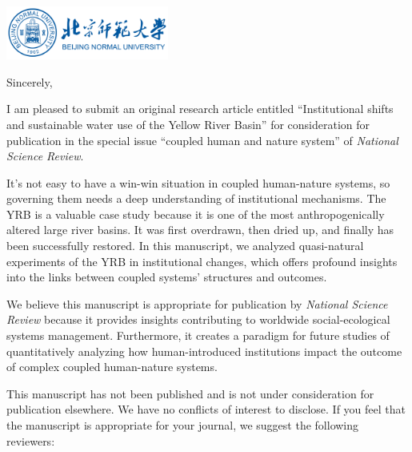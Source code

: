 \documentclass[11pt,a4paper,roman]{moderncv}
\begin{document}
\begin{minipage}[t]{\textwidth}
\includegraphics[width=0.40\textwidth]{bnu}
\end{minipage}


\opening{\vspace*{-2em}}
\closing{Sincerely,}{\vspace*{-2em}}
\makelettertitle

I am pleased to submit an original research article entitled ``Institutional shifts and sustainable water use of the Yellow River Basin'' for consideration for publication in the special issue ``coupled human and nature system'' of \textit{National Science Review}.

It's not easy to have a win-win situation in coupled human-nature systems, so governing them needs a deep understanding of institutional mechanisms. The YRB is a valuable case study because it is one of the most anthropogenically altered large river basins. It was first overdrawn, then dried up, and finally has been successfully restored. In this manuscript, we analyzed quasi-natural experiments of the YRB in institutional changes, which offers profound insights into the links between coupled systems' structures and outcomes.

We believe this manuscript is appropriate for publication by \textit{National Science Review} because it provides insights contributing to worldwide social-ecological systems management. Furthermore, it creates a paradigm for future studies of quantitatively analyzing how human-introduced institutions impact the outcome of complex coupled human-nature systems.

This manuscript has not been published and is not under consideration for publication elsewhere.  We have no conflicts of interest to disclose. If you feel that the manuscript is appropriate for your journal, we suggest the following reviewers:
\end{document}
